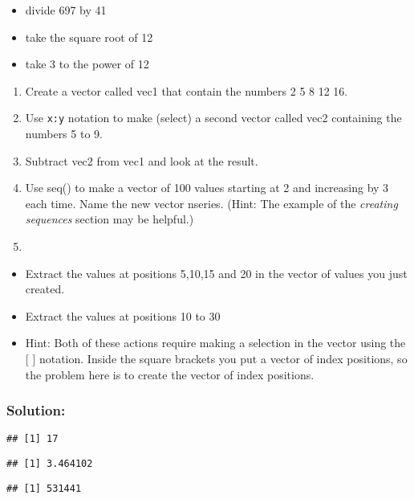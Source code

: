 \documentclass[
]{article}
\providecommand{\tightlist}{%
  \setlength{\itemsep}{0pt}\setlength{\parskip}{0pt}}
\begin{document}
\begin{itemize}
\tightlist
\item
  divide 697 by 41
\item
  take the square root of 12
\item
  take 3 to the power of 12
\end{itemize}

\begin{enumerate}
\def\labelenumi{\arabic{enumi}.}
\setcounter{enumi}{1}
\item
  Create a vector called vec1 that contain the numbers 2 5 8 12 16.
\item
  Use \texttt{x:y} notation to make (select) a second vector called vec2
  containing the numbers 5 to 9.
\item
  Subtract vec2 from vec1 and look at the result.
\item
  Use seq() to make a vector of 100 values starting at 2 and increasing
  by 3 each time. Name the new vector nseries. (Hint: The example of the
  \emph{creating sequences} section may be helpful.)
\item
\end{enumerate}

\begin{itemize}
\tightlist
\item
  Extract the values at positions 5,10,15 and 20 in the vector of values
  you just created.
\item
  Extract the values at positions 10 to 30
\item
  Hint: Both of these actions require making a selection in the vector
  using the {[} {]} notation. Inside the square brackets you put a
  vector of index positions, so the problem here is to create the vector
  of index positions.
\end{itemize}

\hypertarget{solution}{%
\subsubsection{Solution:}\label{solution}}

\begin{verbatim}
## [1] 17
\end{verbatim}

\begin{verbatim}
## [1] 3.464102
\end{verbatim}

\begin{verbatim}
## [1] 531441
\end{verbatim}
\end{document}
